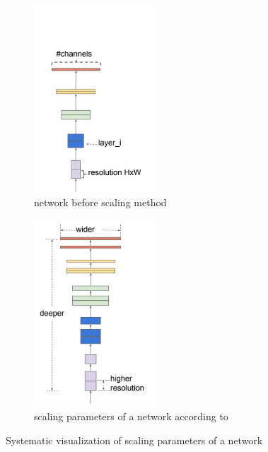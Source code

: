 \begin{figure}[H]
    \centering
    \begin{subfigure}{0.4\textwidth}
        \centering
        \includegraphics[width=\linewidth, height=7cm, keepaspectratio]{PICs/backbones/EfficientNet_baseline.jpg}
        \caption{network before scaling method}
        \label{fig:efficientNet_baseline}
    \end{subfigure}
    \qquad
    \begin{subfigure}{0.4\textwidth}
        \centering
        \includegraphics[width=\linewidth, height=7cm, keepaspectratio]{PICs/backbones/EfficientNet_scaling.jpg}
        \caption{scaling parameters of a network according to \cite{EfficientNet}}
        \label{fig:efficientNet_scaled}
    \end{subfigure}
    \caption{Systematic visualization of scaling parameters of a network \cite{EfficientNet}}
    \label{fig:efficientNet_networks}
\end{figure}